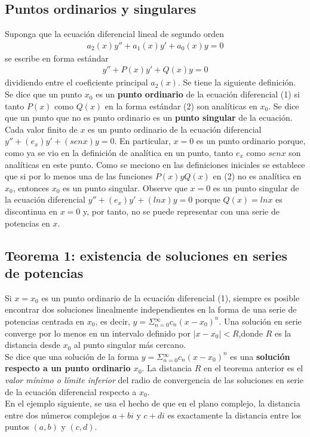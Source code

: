 \documentclass[12pt,letterpaper,oneside]{article}
\begin{document}
\subsection{Puntos ordinarios y singulares}
Suponga que la ecuación diferencial lineal de segundo orden\\
\begin{align}
a_2(x)y'' + a_1(x)y' + a_0(x)y = 0
\end{align}
se escribe en forma estándar\\
\begin{align}
y'' + P(x)y' + Q(x)y = 0
\end{align}
dividiendo entre el coeficiente principal $a_2(x)$. Se tiene la siguiente definición.\\
Se dice que un punto $x_0$ es un \textbf{punto ordinario} de la ecuación diferencial (1) si tanto $P(x)$ como $Q(x)$ en la forma estándar (2) son analíticas en $x_0$. Se dice que un punto que no es punto ordinario es un \textbf{punto singular} de la ecuación.\vspace{0.3cm}\\
Cada valor finito de $x$ es un punto ordinario de la ecuación diferencial $y'' +  (e_x)y'+ (sen x)y = 0$. En particular, $x = 0$ es un punto ordinario porque, como ya se vio en la definición de analítica en un punto, tanto $e_x$ como $sen x$ son analíticas en este punto. Como se meciono en las definiciones iniciales se establece que si por lo menos una de las funciones $P(x) y Q(x)$ en (2) no es analítica en $x_0$, entonces $x_0$ es un punto singular. Observe que $x = 0$ es un punto singular de la ecuación diferencial $y'' + (e_x)y'+ (ln x)y = 0$ porque $Q(x) = ln x$ es discontinua en $x = 0$ y, por tanto, no se puede representar con una serie de potencias en $x$.
\subsection{Teorema 1: existencia de soluciones en series de potencias}
Si $x = x_0$ es un punto ordinario de la ecuación diferencial (1), siempre es posible encontrar dos soluciones linealmente independientes en la forma de una serie de potencias centrada en $x_0$, es decir, $y = \Sigma{^\infty_{n=0}} c_n(x - x_0)^n$. Una solución en serie converge por lo menos en un intervalo definido por $|x - x_0| < R$,donde $R$ es la distancia desde $x_0$ al punto singular más cercano.\vspace{0.3cm}\\
Se dice que una solución de la forma $y = \Sigma{^\infty_{n=0}} c_n(x - x_0)^n$ es una \textbf{solución respecto a un punto ordinario $x_0$}. La distancia $R$ en el teorema anterior es el \textit{valor mínimo
o límite inferior} del radio de convergencia de las soluciones en serie de la ecuación
diferencial respecto a $x_0$.\\
En el ejemplo siguiente, se usa el hecho de que en el plano complejo, la distancia entre dos números complejos $a + bi$ y $c + di$ es exactamente la distancia entre los puntos $(a, b)$ y $(c, d)$.
\end{document}
